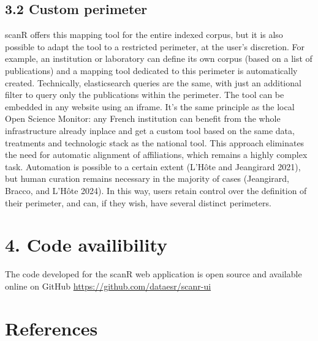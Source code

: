 \documentclass[
]{article}
\begin{document}
\hypertarget{custom-perimeter}{%
\subsection{3.2 Custom perimeter}\label{custom-perimeter}}

scanR offers this mapping tool for the entire indexed corpus, but it is
also possible to adapt the tool to a restricted perimeter, at the user's
discretion. For example, an institution or laboratory can define its own
corpus (based on a list of publications) and a mapping tool dedicated to
this perimeter is automatically created. Technically, elasticsearch
queries are the same, with just an additional filter to query only the
publications within the perimeter. The tool can be embedded in any
website using an iframe. It's the same principle as the local Open
Science Monitor: any French institution can benefit from the whole
infrastructure already inplace and get a custom tool based on the same
data, treatments and technologic stack as the national tool. This
approach eliminates the need for automatic alignment of affiliations,
which remains a highly complex task. Automation is possible to a certain
extent (L'Hôte and Jeangirard 2021), but human curation remains
necessary in the majority of cases (Jeangirard, Bracco, and L'Hôte
2024). In this way, users retain control over the definition of their
perimeter, and can, if they wish, have several distinct perimeters.

\hypertarget{code-availibility}{%
\section{4. Code availibility}\label{code-availibility}}

The code developed for the scanR web application is open source and
available online on GitHub \url{https://github.com/dataesr/scanr-ui}

\hypertarget{references}{%
\section*{References}\label{references}}
\end{document}

